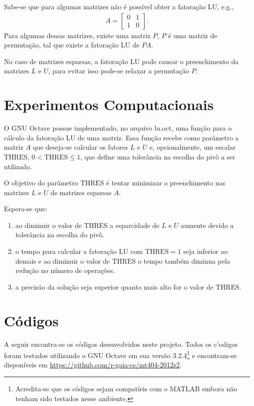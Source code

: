 \documentclass[12pt,a4paper]{article}
\begin{document}
Sabe-se que para algumas matrizes n\~{a}o \'{e} poss\'{i}vel obter a
fatora\c{c}\~{a}o LU, e.g.,
\begin{align*}
    A = \begin{bmatrix}
        0 & 1 \\
        1 & 0
    \end{bmatrix}.
\end{align*}
Para algumas dessas matrizes, existe uma matriz $P$, $P$ \'{e} uma matriz de
permuta\c{c}\~{a}o, tal que existe a fatora\c{c}\~{a}o LU de $P A$.

No caso de matrizes esparsas, a fatora\c{c}\~{a}o LU pode causar o preenchimento
da matrizes $L$ e $U$, para evitar isso pode-se relaxar a permuta\c{c}\~{a}o
$P$.

\section{Experimentos Computacionais}
O GNU Octave possue implementado, no arquivo lu.oct, uma fun\c{c}\~{a}o para o c\'{a}lculo da
fatora\c{c}\~{a}o LU de uma matriz. Essa fun\c{c}\~{a}o recebe como
par\^{a}metro a matriz $A$ que deseja-se calcular os fatores $L$ e $U$ e,
opcionalmente, um escalar $\mathrm{THRES}$, $0 < \mathrm{THRES} \leq 1$, que
define uma toler\^{a}ncia na escolha do piv\^{o} a ser utilizado.

O objetivo do par\^{a}metro $\mathrm{THRES}$ \'{e} tentar minimizar o
preenchimento nas matrizes $L$ e $U$ de matrizes esparsas $A$.

Espera-se que:
\begin{enumerate}
    \item ao diminuir o valor de $\mathrm{THRES}$ a esparcidade de $L$ e $U$
        aumente devido a toler\^{a}ncia na escolha do piv\^{o}.
    \item o tempo para calcular a fatora\c{c}\~{a}o LU com $\mathrm{THRES} = 1$
        seja inferior ao demais e ao diminuir o valor de $\mathrm{THRES}$ o
        tempo tamb\'{e}m diminua pela redu\c{c}\~{a}o no n\'{u}mero de
        opera\c{c}\~{o}es.
    \item a precis\~{a}o da solu\c{c}\~{a}o seja superior quanto mais alto for o
        valor de $\mathrm{THRES}$.
\end{enumerate}

\section{C\'{o}digos}
A seguir encontra-se os c\'{o}digos desenvolvidos neste projeto. Todos os c'{o}digos
foram testados utilizando o GNU Octave em sua vers\~{a}o
3.2.4\footnote{Acredita-se que os c\'{o}digos sejam compat\'{i}eis com o MATLAB
embora n\~{a}o tenham sido testados nesse ambiente.} e encontram-se
dispon\'{i}veis em \url{https://github.com/r-gaia-cs/mt404-2012s2}.

\end{document}
